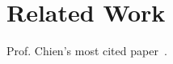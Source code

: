 \chapter{Related Work}
\label{ch:related_work}

Prof. Chien’s most cited paper~\cite{chien2002efficient}.
